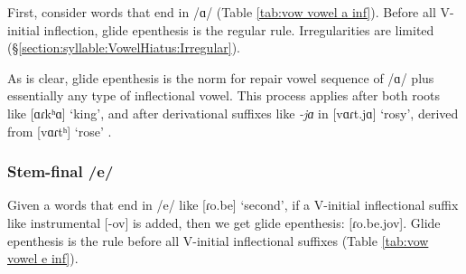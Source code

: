 {	First, consider words that end in /ɑ/ (Table \ref{tab:vow vowel a inf}). Before all V-initial inflection, glide epenthesis is the regular rule.  Irregularities are limited (\S\ref{section:syllable:VowelHiatus:Irregular}). 
	
	\begin{table}[H]
		\centering
		\caption{Glide epenthesis between /ɑ/ and V-initial inflection}
		\label{tab:vow vowel a inf}
		\end{table}
	
	As is clear, glide epenthesis is the norm for repair vowel sequence of /ɑ/ plus essentially any type of inflectional vowel. This process applies after both roots like [ɑɾkʰɑ] `king', and after derivational suffixes like \textit{-jɑ} in [vɑɾt.jɑ] `rosy', derived from [vɑɾtʰ] `rose' . 
	
	
	
	\subsubsection{Stem-final /e/}\label{section:syllable:VowelHiatus:Inf:E}
	Given a words   that end in /e/ like [ɾo.be] `second', if a V-initial inflectional suffix like instrumental [-ov] is added, then we get glide epenthesis: [ɾo.be.jov]. Glide epenthesis is the rule before all V-initial inflectional suffixes (Table \ref{tab:vow vowel e inf}). 
	
}

